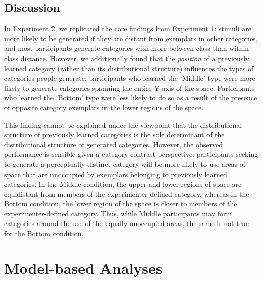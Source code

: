 \documentclass[12pt]{article}
\begin{document}
\begin{flushleft}
\subsection{Discussion}

In Experiment 2, we replicated the core findings from Experiment 1: stimuli are more likely to be generated if they are distant from exemplars in other categories, and most participants generate categories with more between-class than within-class distance. However, we additionally found that the \textit{position} of a previously learned category (rather than its distributional structure) influences the types of categories people generate: participants who learned the `Middle' type were more likely to generate categories spanning the entire Y-axis of the space. Participants who learned the `Bottom' type were less likely to do so as a result of the presence of opposite category exemplars in the lower regions of the space.

This finding cannot be explained under the viewpoint that the distributional structure of previously learned categories is the sole determinant of the distributional structure of generated categories. However, the observed performance is sensible given a category contrast perspective: participants seeking to generate a perceptually distinct category will be more likely to use areas of space that are unoccupied by exemplars belonging to previously learned categories. In the Middle condition, the upper and lower regions of space are equidistant from members of the experimenter-defined category, whereas in the Bottom condition, the lower region of the space is closer to members of the experimenter-defined category. Thus, while Middle participants may form categories around the use of the equally unoccupied areas, the same is not true for the Bottom condition.

\section{Model-based Analyses}


\end{flushleft}
\end{document}
